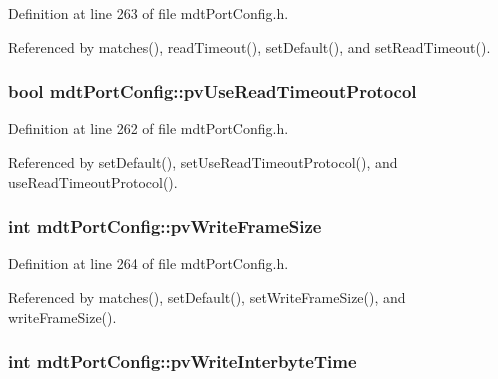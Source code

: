 Definition at line 263 of file mdt\-Port\-Config.\-h.



Referenced by matches(), read\-Timeout(), set\-Default(), and set\-Read\-Timeout().

\hypertarget{classmdt_port_config_a1a5ab2cf82ea35db627aa8b87f9dba2e}{
\subsubsection[{pv\-Use\-Read\-Timeout\-Protocol}]{\setlength{\rightskip}{0pt plus 5cm}bool mdt\-Port\-Config\-::pv\-Use\-Read\-Timeout\-Protocol\hspace{0.3cm}{\ttfamily [protected]}}}\label{classmdt_port_config_a1a5ab2cf82ea35db627aa8b87f9dba2e}


Definition at line 262 of file mdt\-Port\-Config.\-h.



Referenced by set\-Default(), set\-Use\-Read\-Timeout\-Protocol(), and use\-Read\-Timeout\-Protocol().

\hypertarget{classmdt_port_config_aeaeb93ea4d49f66ff9613c7499e670f4}{
\subsubsection[{pv\-Write\-Frame\-Size}]{\setlength{\rightskip}{0pt plus 5cm}int mdt\-Port\-Config\-::pv\-Write\-Frame\-Size\hspace{0.3cm}{\ttfamily [protected]}}}\label{classmdt_port_config_aeaeb93ea4d49f66ff9613c7499e670f4}


Definition at line 264 of file mdt\-Port\-Config.\-h.



Referenced by matches(), set\-Default(), set\-Write\-Frame\-Size(), and write\-Frame\-Size().

\hypertarget{classmdt_port_config_af983cf9d9f9e2f124d6dcc83cdca5a3e}{
\subsubsection[{pv\-Write\-Interbyte\-Time}]{\setlength{\rightskip}{0pt plus 5cm}int mdt\-Port\-Config\-::pv\-Write\-Interbyte\-Time\hspace{0.3cm}{\ttfamily [protected]}}}\label{classmdt_port_config_af983cf9d9f9e2f124d6dcc83cdca5a3e}


